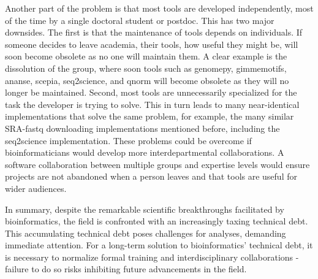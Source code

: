 Another part of the problem is that most tools are developed independently, most of the time by a single doctoral student or postdoc. This has two major downsides. The first is that the maintenance of tools depends on individuals. If someone decides to leave academia, their tools, how useful they might be, will soon become obsolete as no one will maintain them. A clear example is the dissolution of the  group, where soon tools such as genomepy\cite{genomepy}, gimmemotifs\cite{Bruse_2018}, ananse\cite{Xu_2020}, scepia, seq2science\cite{seq2science}, and qnorm\cite{qnorm} will become obsolete as they will no longer be maintained. Second, most tools are unnecessarily specialized for the task the developer is trying to solve. This in turn leads to many near-identical implementations that solve the same problem, for example, the many similar SRA-fastq downloading implementations mentioned before, including the seq2science implementation. These problems could be overcome if bioinformaticians would develop more interdepartmental collaborations. A software collaboration between multiple groups and expertise levels would ensure projects are not abandoned when a person leaves and that tools are useful for wider audiences.

In summary, despite the remarkable scientific breakthroughs facilitated by bioinformatics, the field is confronted with an increasingly taxing technical debt. This accumulating technical debt poses challenges for analyses, demanding immediate attention. For a long-term solution to bioinformatics' technical debt, it is necessary to normalize formal training and interdisciplinary collaborations - failure to do so risks inhibiting future advancements in the field.
